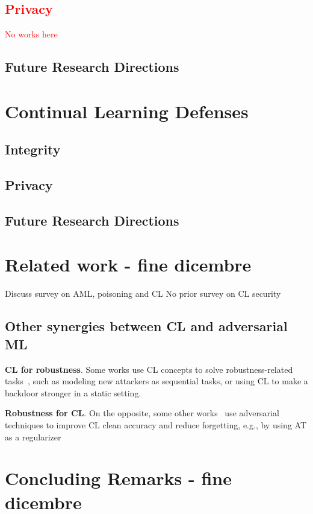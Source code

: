 \documentclass[5p,times]{elsarticle}
\newcommand{\myparagraph}[1]{\noindent \textbf{#1}.}
\begin{document}
\subsection{\textcolor{red}{Privacy}}
\textcolor{red}{No works here}

\subsection{Future Research Directions}

\section{Continual Learning Defenses}
\subsection{Integrity}
\subsection{Privacy}

\subsection{Future Research Directions}

\section{Related work - fine dicembre}
Discuss survey on AML, poisoning and CL
No prior survey on CL security

\subsection{Other synergies between CL and adversarial ML}
\myparagraph{CL for robustness}
Some works use CL concepts to solve robustness-related tasks~\cite{Chou-CW2022, Zhou-CVPR2024, Pham-ECCV2024}, such as modeling new attackers as sequential tasks, or using CL to make a backdoor stronger in a static setting.

\myparagraph{Robustness for CL}
On the opposite, some other works~\cite{Kumari-NeurIPS2022, Wang-ICML2022, Yu-AAAI2025} use adversarial techniques to improve CL clean accuracy and reduce forgetting, e.g., by using AT as a regularizer

\section{Concluding Remarks - fine dicembre}
\end{document}
